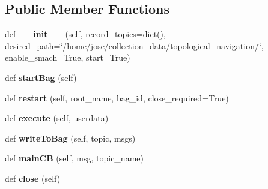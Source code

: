 \subsection*{Public Member Functions}
\begin{DoxyCompactItemize}
\item 
\mbox{\label{classgr__topological__navigation_1_1states_1_1utils_1_1BagRecorder_ae3cf8fcb5131f95fd4a174222f8f364b}} 
def {\bfseries \+\_\+\+\_\+init\+\_\+\+\_\+} (self, record\+\_\+topics=dict(), desired\+\_\+path=\char`\"{}/home/jose/collection\+\_\+data/topological\+\_\+navigation/\char`\"{}, enable\+\_\+smach=True, start=True)
\item 
\mbox{\label{classgr__topological__navigation_1_1states_1_1utils_1_1BagRecorder_a08ecd952e6a51aab3df00daaf7b7711c}} 
def {\bfseries start\+Bag} (self)
\item 
\mbox{\label{classgr__topological__navigation_1_1states_1_1utils_1_1BagRecorder_a37dc40c02322888061c6ace5f4a0d209}} 
def {\bfseries restart} (self, root\+\_\+name, bag\+\_\+id, close\+\_\+required=True)
\item 
\mbox{\label{classgr__topological__navigation_1_1states_1_1utils_1_1BagRecorder_acbde6b6f09f10502cecf9531220a6fee}} 
def {\bfseries execute} (self, userdata)
\item 
\mbox{\label{classgr__topological__navigation_1_1states_1_1utils_1_1BagRecorder_ac683946de6e556a59d8f69ab15c94fef}} 
def {\bfseries write\+To\+Bag} (self, topic, msgs)
\item 
\mbox{\label{classgr__topological__navigation_1_1states_1_1utils_1_1BagRecorder_ace8e999f3eb6282f3d427473c386e35c}} 
def {\bfseries main\+CB} (self, msg, topic\+\_\+name)
\item 
\mbox{\label{classgr__topological__navigation_1_1states_1_1utils_1_1BagRecorder_ac064c83956e44409472ce51a10a32c95}} 
def {\bfseries close} (self)
\end{DoxyCompactItemize}
